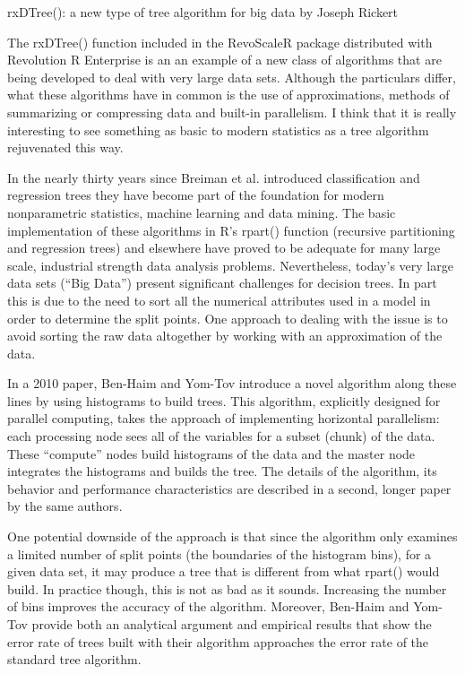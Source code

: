rxDTree(): a new type of tree algorithm for big data
by Joseph Rickert


The rxDTree() function included in the RevoScaleR package distributed with Revolution R Enterprise is an an example of a new class of algorithms that are being developed to deal with very large data sets. Although the particulars differ, what these algorithms have in common is the use of approximations, methods of summarizing or compressing data and built-in parallelism. I think that it is really interesting to see something as basic to modern statistics as a tree algorithm rejuvenated this way.

In the nearly thirty years since Breiman et al. introduced classification and regression trees they have become part of the foundation for modern nonparametric statistics, machine learning and data mining. The basic implementation of these algorithms in R’s rpart() function (recursive partitioning and regression trees) and elsewhere have proved to be adequate for many large scale, industrial strength data analysis problems. Nevertheless, today’s very large data sets (“Big Data”) present significant challenges for decision trees. In part this is due to the need to sort all the numerical attributes used in a model in order to determine the split points. One approach to dealing with the issue is to avoid sorting the raw data altogether by working with an approximation of the data.

In a 2010 paper, Ben-Haim and Yom-Tov introduce a novel algorithm along these lines by using histograms to build trees. This algorithm, explicitly designed for parallel computing, takes the approach of implementing horizontal parallelism: each processing node sees all of the variables for a subset (chunk) of the data. These “compute” nodes build histograms of the data and the master node integrates the histograms and builds the tree. The details of the algorithm, its behavior and performance characteristics are described in a second, longer paper by the same authors.

One potential downside of the approach is that since the algorithm only examines a limited number of split points (the boundaries of the histogram bins), for a given data set, it may produce a tree that is different from what rpart() would build. In practice though, this is not as bad as it sounds. Increasing the number of bins improves the accuracy of the algorithm. Moreover, Ben-Haim and Yom-Tov provide both an analytical argument and empirical results that show the error rate of trees built with their algorithm approaches the error rate of the standard tree algorithm.

